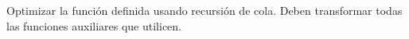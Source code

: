 Optimizar la función definida usando recursión de cola. 
Deben transformar todas las funciones auxiliares que utilicen.